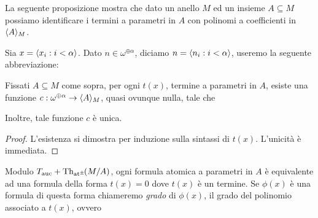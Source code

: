 La seguente proposizione mostra che dato un anello $M$ ed un insieme $A\subseteq M$ possiamo identificare i termini a parametri in $A$ con polinomi a coefficienti in $\langle A\rangle_M$.

\begin{proposition}
\label{formacanonicaterminiau}
Sia $x=\langle x_i: i<\alpha\rangle$. Dato $n\in\omega^{\oplus\alpha}$, diciamo $n=\langle n_i: i<\alpha\rangle$, useremo la seguente abbreviazione:


Fissati $A\subseteq M$ come sopra, per ogni $t(x)$, termine a parametri in $A$, esiste una funzione $c:\omega^{\oplus\alpha}\to\langle A\rangle_M$, quasi ovunque nulla, tale che


Inoltre, tale funzione $c$ \`e unica.%
\end{proposition}

\begin{proof}
L'esistenza si dimostra per induzione sulla sintassi di $t(x)$. L'unicit\`a \`e immediata. %
% 
% 
\end{proof}

% 
% 
Modulo $T_{\rm auc}+\textrm{Th}_{{\tiny\rm at^\pm}}\hskip-.3ex(M/A)$, ogni formula atomica a parametri in $A$ \`e equivalente ad una formula della forma $t(x)=0$ dove $t(x)$ \`e un termine. Se $\phi(x)$ \`e una formula di questa forma chiameremo \emph{grado\/} di $\phi(x)$, il grado del polinomio associato a $t(x)$, ovvero

